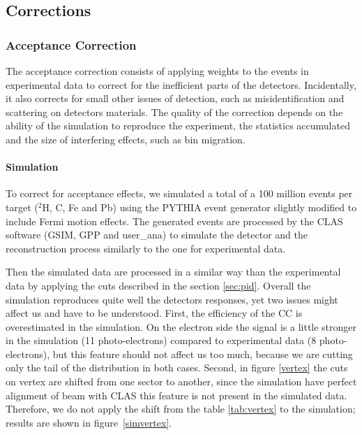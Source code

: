 \subsection{Corrections}
\label{sec:corrections}

\subsubsection{Acceptance Correction}
\label{sec:accept}

The acceptance correction consists of applying weights to the events in 
experimental data to correct for the inefficient parts of the detectors.
Incidentally, it also corrects for small other issues of detection,
such as misidentification and scattering on detectors materials. The quality 
of the correction depends on the ability of the simulation to reproduce the 
experiment, the statistics accumulated and the size of interfering effects, such 
as bin migration.

\paragraph{Simulation}
\label{sec:simul}

To correct for acceptance effects, we simulated a total of a 100 million events 
per target ($^2$H, C, Fe and Pb) using the PYTHIA \cite{Sjostrand:2006za} 
event generator slightly modified to include Fermi motion effects. The 
generated events are processed by the CLAS software (GSIM, GPP and user\_ana) 
to simulate the detector and the reconstruction process similarly to the one for 
experimental data.

Then the simulated data are processed in a similar way than the experimental data by 
applying the cuts described in the section \ref{sec:pid}. Overall the 
simulation reproduces quite well the detectors responses, yet two issues might 
affect us and have to be understood. First, the efficiency of the CC is 
overestimated in the simulation. 
On the electron side the signal is a little stronger in the simulation (11 
photo-electrons) compared to experimental data (8 photo-electrons), but this 
feature should not affect us too much, because we are cutting only the tail of the 
distribution in both cases. 
Second, in figure \ref{vertex} the cuts on vertex are shifted from one sector 
to another, since the simulation have perfect alignment of beam with CLAS this 
feature is not present in the simulated data. Therefore, we do not apply the 
shift from the table \ref{tab:vertex} to the simulation; results are shown in 
figure~\ref{simvertex}.

